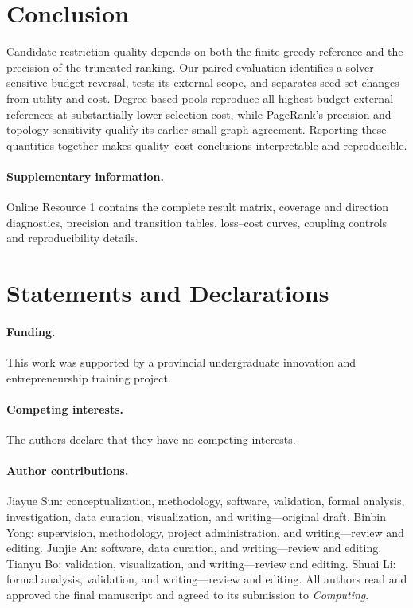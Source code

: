 \documentclass[smallextended]{svjour3}
\begin{document}
\section{Conclusion}
Candidate-restriction quality depends on both the finite greedy reference and the precision of the truncated ranking. Our paired evaluation identifies a solver-sensitive budget reversal, tests its external scope, and separates seed-set changes from utility and cost. Degree-based pools reproduce all highest-budget external references at substantially lower selection cost, while PageRank's precision and topology sensitivity qualify its earlier small-graph agreement. Reporting these quantities together makes quality--cost conclusions interpretable and reproducible.

\paragraph{Supplementary information.} Online Resource 1 contains the complete result matrix, coverage and direction diagnostics, precision and transition tables, loss--cost curves, coupling controls and reproducibility details.
\section*{Statements and Declarations}
\paragraph{Funding.} This work was supported by a provincial undergraduate innovation and entrepreneurship training project.
\paragraph{Competing interests.} The authors declare that they have no competing interests.
\paragraph{Author contributions.} Jiayue Sun: conceptualization, methodology, software, validation, formal analysis, investigation, data curation, visualization, and writing---original draft. Binbin Yong: supervision, methodology, project administration, and writing---review and editing. Junjie An: software, data curation, and writing---review and editing. Tianyu Bo: validation, visualization, and writing---review and editing. Shuai Li: formal analysis, validation, and writing---review and editing. All authors read and approved the final manuscript and agreed to its submission to \textit{Computing}.
\end{document}

